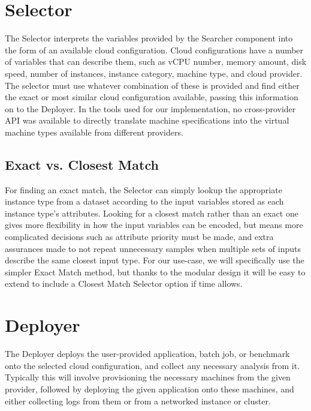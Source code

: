 \documentclass{report}
\begin{document}
\section{Selector}
The Selector interprets the variables provided by the Searcher component into the form of an available cloud configuration. Cloud configurations have a number of variables that can describe them, such as vCPU number, memory amount, disk speed, number of instances, instance category, machine type, and cloud provider. The selector must use whatever combination of these is provided and find either the exact or most similar cloud configuration available, passing this information on to the Deployer. In the tools used for our implementation, no cross-provider API was available to directly translate machine specifications into the virtual machine types available from different providers.

\subsection{Exact vs. Closest Match}
For finding an exact match, the Selector can simply lookup the appropriate instance type from a dataset according to the input variables stored as each instance type's attributes. Looking for a closest match rather than an exact one gives more flexibility in how the input variables can be encoded, but means more complicated decisions such as attribute priority must be made, and extra assurances made to not repeat unnecessary samples when multiple sets of inputs describe the same closest input type. For our use-case, we will specifically use the simpler Exact Match method, but thanks to the modular design it will be easy to extend to include a Closest Match Selector option if time allows.


\section{Deployer}
The Deployer deploys the user-provided application, batch job, or benchmark onto the selected cloud configuration, and collect any necessary analysis from it. Typically this will involve provisioning the necessary machines from the given provider, followed by deploying the given application onto these machines, and either collecting logs from them or from a networked instance or cluster. 
\end{document}

